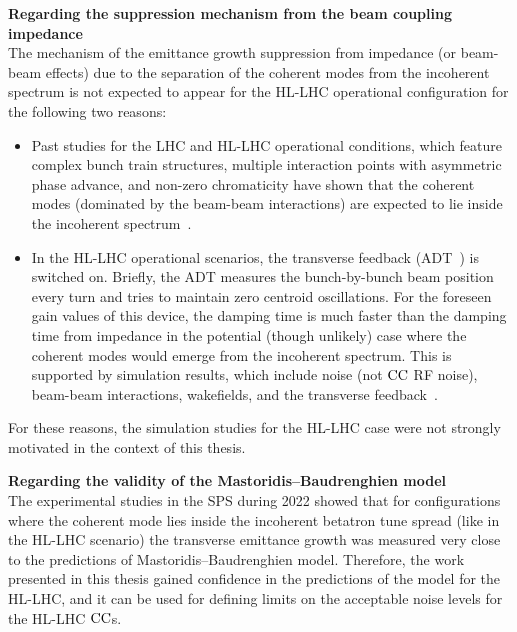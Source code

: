 \textbf{Regarding the suppression mechanism from the beam coupling impedance}\\
The mechanism of the emittance growth suppression from impedance (or beam-beam effects) due to the separation of the coherent modes from the incoherent spectrum is not expected to appear for the HL-LHC operational configuration for the following two reasons:
\begin{itemize}
   \item Past studies for the LHC and HL-LHC operational conditions, which feature complex bunch train structures, multiple interaction points with asymmetric phase advance, and non-zero chromaticity have shown that the coherent modes (dominated by the beam-beam interactions) are expected to lie inside the incoherent spectrum~\cite{Pieloni:1259906, Buffat:2712068}.
   \item In the HL-LHC operational scenarios, the transverse feedback (ADT~\cite{lhc_adt_info_presentation}) is switched on. Briefly, the ADT measures the bunch-by-bunch beam position every turn and tries to maintain zero centroid oscillations. For the foreseen gain values of this device, the damping time is much faster than the damping time from impedance in the potential (though unlikely) case where the coherent modes would emerge from the incoherent spectrum. This is supported by simulation results, which include noise (not ${\mathrm{CC}}$ RF noise), beam-beam interactions, wakefields, and the transverse feedback~\cite{Buffat:2712068}.
\end{itemize}

For these reasons, the simulation studies for the HL-LHC case were not strongly motivated in the context of this thesis.

\textbf{Regarding the validity of the Mastoridis--Baudrenghien model}\\
The experimental studies in the SPS during 2022 showed that for configurations where the coherent mode lies inside the incoherent betatron tune spread (like in the HL-LHC scenario) the transverse emittance growth was measured very close to the predictions of Mastoridis--Baudrenghien model. Therefore, the work presented in this thesis gained confidence in the predictions of the model for the HL-LHC, and it can be used for defining limits on the acceptable noise levels for the HL-LHC ${\mathrm{CC}}$s.





